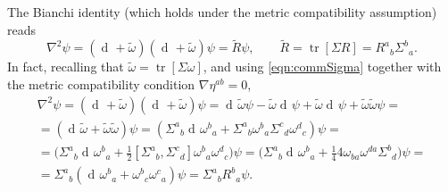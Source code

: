 \documentclass[a4paper,12pt]{book}
\newcommand{\dd}{\mathop{\mathrm{d}\!}{}}
\DeclareMathOperator\tr{tr}
\theoremstyle{definition}
\theoremstyle{remark}
\begin{document}
The Bianchi identity (which holds under the metric compatibility assumption) reads
\[\nabla^2\psi=(\dd+\tilde\omega)(\dd+\tilde\omega)\psi=\tilde R\psi,\qquad \tilde R=\tr[\Sigma R]=R^a{}_b\Sigma^b{}_a.\]
In fact, recalling that $\tilde\omega=\tr[\Sigma\omega]$, and using \cref{eqn:commSigma} together with the metric compatibility condition $\nabla\eta^{ab}=0$,
\begin{multline*}
\nabla^2\psi=(\dd+\tilde\omega)(\dd+\tilde\omega)\psi=\dd\tilde\omega\psi-\tilde\omega\dd\psi+\tilde\omega\dd\psi+\tilde\omega\tilde\omega\psi=\\
=(\dd\tilde\omega+\tilde\omega\tilde\omega)\psi=(\Sigma^a{}_b\dd\omega^b{}_a+\Sigma^a{}_b\omega^b{}_a\Sigma^c{}_d\omega^d{}_c)\psi=\\
=\biggl(\Sigma^a{}_b\dd\omega^b{}_a+\frac{1}{2}[\Sigma^a{}_b,\Sigma^c{}_d]\omega^b{}_a\omega^d{}_c\biggr)\psi=\biggl(\Sigma^a{}_b\dd\omega^b{}_a+\frac{1}{4}4\omega_{ba}\omega^{da}\Sigma^b{}_d\biggr)\psi=\\
=\Sigma^a{}_b(\dd\omega^b{}_a+\omega^b{}_c\omega^c{}_a)\psi=\Sigma^a{}_bR^b{}_a\psi.
\end{multline*}
\end{document}
